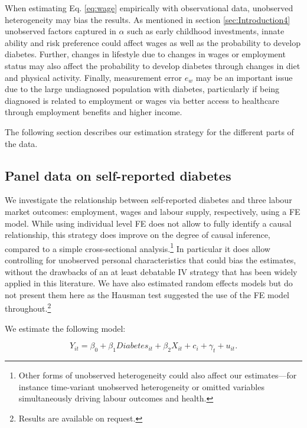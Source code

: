 When estimating Eq. \ref{eq:wage} empirically with observational data, unobserved heterogeneity may bias the results. As mentioned in section  \ref{sec:Introduction4} unobserved factors captured in $\alpha$ such as early childhood investments, innate ability and risk preference could affect wages as well as the probability to develop diabetes. Further, changes in lifestyle due to changes in wages or employment status may also affect the probability to develop diabetes through changes in diet and physical activity. Finally, measurement error $e_w$ may be an important issue due to the large undiagnosed population with diabetes, particularly if being diagnosed is related to employment or wages via better access to healthcare through employment benefits and higher income.

The following section describes our estimation strategy for the different parts of the data.


\subsection{Panel data on self-reported diabetes}

We investigate the relationship between self-reported diabetes and three
labour market outcomes: employment, wages and labour supply, respectively, using a \ac{FE} model. While using individual level \ac{FE} does not allow to fully identify a causal relationship, this strategy does improve on the degree of causal inference, compared to a simple cross-sectional analysis.\footnote{Other forms of unobserved heterogeneity could also affect our estimates---for instance time-variant unobserved heterogeneity or omitted variables simultaneously driving labour outcomes and health.} In particular it does allow controlling for unobserved personal characteristics that could bias the estimates, without the drawbacks of an at least debatable \ac{IV} strategy that has been widely applied in this literature. We have also estimated random effects models but do not present them here as the Hausman test suggested the use of the \ac{FE} model throughout.\footnote{Results are available on request.}


We estimate the following model:

\noindent 
\begin{equation}
Y_{it}=\beta_{0}+\beta_{1}Diabetes_{it}+\beta_{2}X_{it}+c_{i}+\gamma_{t}+u_{it}.\label{eq:employed}
\end{equation}


